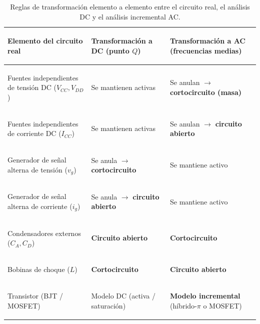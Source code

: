 \documentclass[11pt,a4paper]{article}
\begin{document}
	\begin{table}[H]
		\centering
		\small
		\begin{tabularx}{\textwidth}{@{}>{\bfseries\raggedright\arraybackslash}p{4.8cm} >{\raggedright\arraybackslash}X >{\raggedright\arraybackslash}X@{}}
			\toprule
			\rowcolor{mainblue!15}
			\textbf{Elemento del circuito real} & \textbf{Transformación a DC (punto $Q$)} & \textbf{Transformación a AC (frecuencias medias)} \\
			\midrule
			Fuentes independientes de tensión DC ($V_{CC}, V_{DD}$) & Se mantienen activas & Se anulan $\rightarrow$ \textbf{cortocircuito (masa)} \\
			Fuentes independientes de corriente DC ($I_{CC}$) & Se mantienen activas & Se anulan $\rightarrow$ \textbf{circuito abierto} \\
			Generador de señal alterna de tensión ($v_g$) & Se anula $\rightarrow$ \textbf{cortocircuito} & Se mantiene activo \\
			Generador de señal alterna de corriente ($i_g$) & Se anula $\rightarrow$ \textbf{circuito abierto} & Se mantiene activo \\
			Condensadores externos ($C_A, C_D$) & \textbf{Circuito abierto} & \textbf{Cortocircuito} \\
			Bobinas de choque ($L$) & \textbf{Cortocircuito} & \textbf{Circuito abierto} \\
			Transistor (BJT / MOSFET) & Modelo DC (activa / saturación) & \textbf{Modelo incremental} (híbrido-$\pi$ o MOSFET) \\
			\bottomrule
		\end{tabularx}
		\caption{Reglas de transformación elemento a elemento entre el circuito real, el análisis DC y el análisis incremental AC.}
	\end{table}
\end{document}
